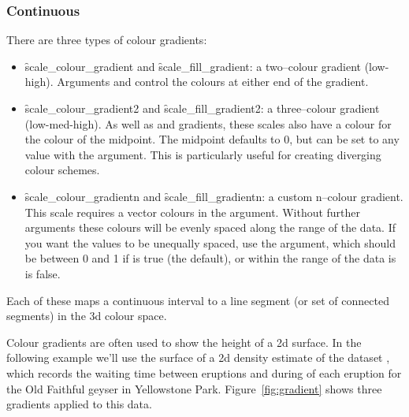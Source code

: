 \subsubsection{Continuous}
\label{ssub:colour-continuous}

There are three types of colour gradients: 

\begin{itemize}
  \item \f{scale_colour_gradient} and \f{scale_fill_gradient}: a two--colour gradient (low-high).  Arguments  and  control the colours at either end of the gradient.

  \item \f{scale_colour_gradient2} and \f{scale_fill_gradient2}: a three--colour gradient (low-med-high).  As well as  and  gradients, these scales also have a  colour for the colour of the midpoint.  The midpoint defaults to 0, but can be set to any value with the  argument.  This is particularly useful for creating diverging colour schemes.

  \item \f{scale_colour_gradientn} and \f{scale_fill_gradientn}: a custom n--colour gradient.  This scale requires a vector colours in the  argument.  Without further arguments these colours will be evenly spaced along the range of the data.  If you want the values to be unequally spaced, use the  argument, which should be between 0 and 1 if  is true (the default), or within the range of the data is  is false.
\end{itemize}

Each of these maps a continuous interval to a line segment (or set of connected segments) in the 3d colour space.  

Colour gradients are often used to show the height of a 2d surface.  In the following example we'll use the surface of a 2d density estimate of the  dataset \citep{azzalini:1990}, which records the waiting time between eruptions and during of each eruption for the Old Faithful geyser in Yellowstone Park. Figure~\ref{fig:gradient} shows three gradients applied to this data.


% 


